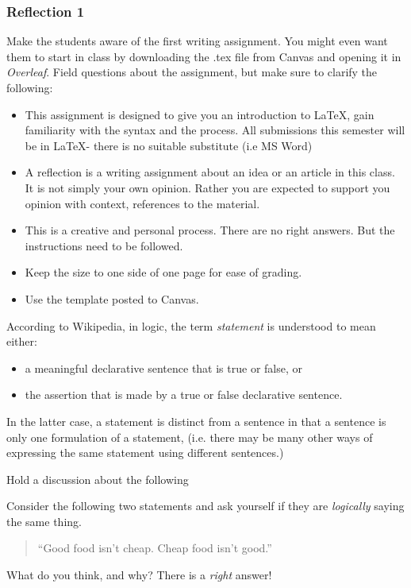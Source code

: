\subsubsection{Reflection 1}
Make the students aware of the first writing assignment.  You might even want them to start in class by downloading the .tex file from Canvas and opening it in \emph{Overleaf}.  Field questions about the assignment, but make sure to clarify the following:
\ifKey
\color{red}

\begin{itemize}
\item This assignment is designed to give you an introduction to \LaTeX, gain familiarity with the syntax and the process.  All submissions this semester will be in \LaTeX - there is no suitable substitute (i.e MS Word)
\item A reflection is a writing assignment about an idea or an article in this class.  It is not simply your own opinion.  Rather you are expected to support you opinion with context, references to the material.  
\item This is a creative and personal process.  There are no right answers.  But the instructions need to be followed. 
\item Keep the size to one side of one page for ease of grading.
\item Use the template posted to Canvas.
\end{itemize}  

\color{black}
\else
{}
\fi


\ifKey
\color{red}
\begin{definition}[Statement]
According to Wikipedia, in logic, the term \emph{statement} is understood to mean either:
\begin{itemize}
\item  a meaningful declarative sentence that is true or false, or
\item  the assertion that is made by a true or false declarative sentence.
\end{itemize}
In the latter case, a statement is distinct from a sentence in that a sentence is only one formulation of a statement, (i.e. there may be many other ways of expressing the same statement using different sentences.) 
\end{definition}
\color{black}
\else
{}
\fi



\ifKey
\color{red}
Hold a discussion about the following
\begin{problem} 
Consider the following two statements and ask yourself if they are \emph{logically} saying the same thing.
\begin{quotation}
``Good food isn't cheap. Cheap food isn't good.''
\end{quotation}
What do you think, and why?  There is a \emph{right} answer!
\end{problem}
\color{black}
\else
{}
\fi

